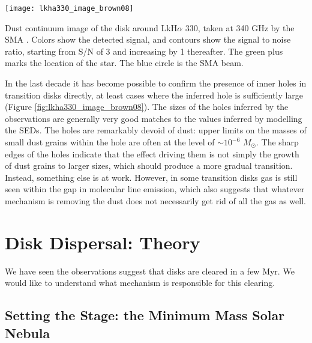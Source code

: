 \begin{marginfigure}
\texttt{[image: lkha330\_image\_brown08]}
\caption[Dust continuum image of the disk around LkH$\alpha$ 330]{
\label{fig:lkha330_image_brown08}
Dust continuum image of the disk around LkH$\alpha$ 330, taken at 340 GHz by the SMA \citep{brown08a}. Colors show the detected signal, and contours show the signal to noise ratio, starting from S/N of 3 and increasing by 1 thereafter. The green plus marks the location of the star. The blue circle is the SMA beam.
}
\end{marginfigure}

In the last decade it has become possible to confirm the presence of inner holes in transition disks directly, at least cases where the inferred hole is sufficiently large (Figure \ref{fig:lkha330_image_brown08}). The sizes of the holes inferred by the observations are generally very good matches to the values inferred by modelling the SEDs. The holes are remarkably devoid of dust: upper limits on the masses of small dust grains within the hole are often at the level of $\sim 10^{-6}$ $M_\odot$. The sharp edges of the holes indicate that the effect driving them is not simply the growth of dust grains to larger sizes, which should produce a more gradual transition. Instead, something else is at work. However, in some transition disks gas is still seen within the gap in molecular line emission, which also suggests that whatever mechanism is removing the dust does not necessarily get rid of all the gas as well.

\section{Disk Dispersal: Theory}

We have seen the observations suggest that disks are cleared in a few Myr. We would like to understand what mechanism is responsible for this clearing.

\subsection{Setting the Stage: the Minimum Mass Solar Nebula}

